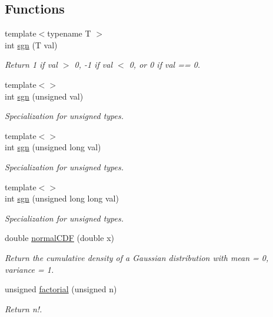 \subsection*{Functions}
\begin{DoxyCompactItemize}
\item 
{\footnotesize template$<$typename T $>$ }\\int \hyperlink{namespacekmath_a1e0f4e049ef1ec26bf84a8aa77f067d1}{sgn} (T val)
\begin{DoxyCompactList}\small\item\em Return 1 if {\ttfamily val} $>$ 0, -\/1 if {\ttfamily val} $<$ 0, or 0 if {\ttfamily val} == 0. \end{DoxyCompactList}\item 
{\footnotesize template$<$$>$ }\\int \hyperlink{namespacekmath_af5735a3b3983474d19d1a982a26cb473}{sgn} (unsigned val)
\begin{DoxyCompactList}\small\item\em Specialization for unsigned types. \end{DoxyCompactList}\item 
{\footnotesize template$<$$>$ }\\int \hyperlink{namespacekmath_a7308728815e450bfe583078b893afd2b}{sgn} (unsigned long val)
\begin{DoxyCompactList}\small\item\em Specialization for unsigned types. \end{DoxyCompactList}\item 
{\footnotesize template$<$$>$ }\\int \hyperlink{namespacekmath_a06e8ca1a174b7eb44ba4ffdebbdf0179}{sgn} (unsigned long long val)
\begin{DoxyCompactList}\small\item\em Specialization for unsigned types. \end{DoxyCompactList}\item 
double \hyperlink{namespacekmath_ac9d0f66e32f84c22626883c171893f48}{normal\-C\-D\-F} (double x)
\begin{DoxyCompactList}\small\item\em Return the cumulative density of a Gaussian distribution with mean = 0, variance = 1. \end{DoxyCompactList}\item 
unsigned \hyperlink{namespacekmath_abfda38c9ce9a9d07af7f93a731d8fe51}{factorial} (unsigned n)
\begin{DoxyCompactList}\small\item\em Return {\ttfamily n!}. \end{DoxyCompactList}\item 

\end{DoxyCompactItemize}
